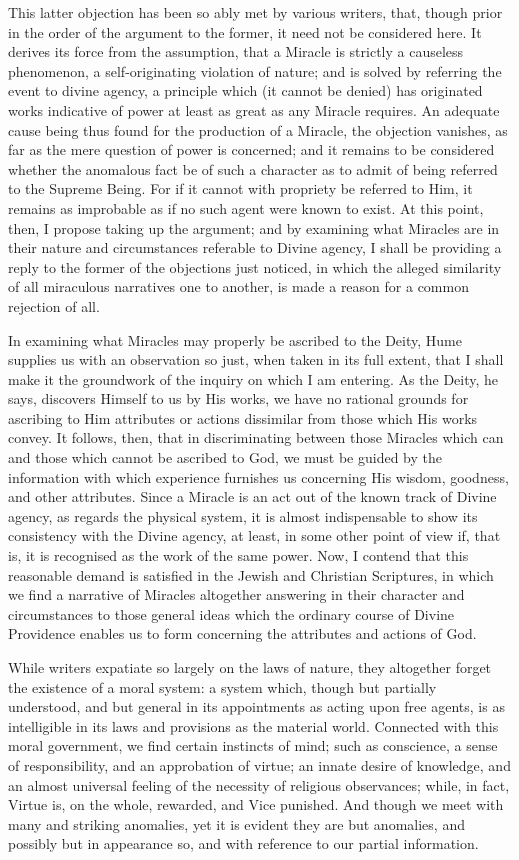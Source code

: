 This latter objection has been so ably met by
various writers, that, though prior in the order of the argument to
the former, it need not be considered here. It derives its force from
the assumption, that a Miracle is strictly a causeless phenomenon, a
self-originating violation of nature; and is solved by referring the
event to divine agency, a principle which (it cannot be denied) has
originated works indicative of power at least as great as any Miracle
requires. An adequate cause being thus found for the production of a
Miracle, the objection vanishes, as far as the mere question of power
is concerned; and it remains to be considered whether the anomalous
fact be of such a character as to admit of being referred to the
Supreme Being. For if it cannot with propriety be referred to Him, it
remains as improbable as if no such agent were known to exist. At this
point, then, I propose taking up the argument; and by examining what
Miracles are in their nature and circumstances referable to Divine
agency, I shall be providing a reply to the former of the objections
just noticed, in which the alleged similarity of all miraculous
narratives one to another, is made a reason for a common rejection of
all.

In examining what Miracles may properly be
ascribed to the Deity, Hume supplies us with an observation so just, when taken in its full extent, that I shall make it the
groundwork of the inquiry on which I am entering. As the Deity, he
says, discovers Himself to us by His works, we have no rational
grounds for ascribing to Him attributes or actions dissimilar from
those which His works convey. It follows, then, that in discriminating
between those Miracles which can and those which cannot be ascribed to
God, we must be guided by the information with which experience
furnishes us concerning His wisdom, goodness, and other attributes.
Since a Miracle is an act out of the known track of Divine agency, as
regards the physical system, it is almost indispensable to show its
consistency with the Divine agency, at least, in some other point of
view if, that is, it is recognised as the work of the same power. Now,
I contend that this reasonable demand is satisfied in the Jewish and
Christian Scriptures, in which we find a narrative of Miracles
altogether answering in their character and circumstances to those
general ideas which the ordinary course of Divine Providence enables
us to form concerning the attributes and actions of God.

While writers expatiate so largely on the laws of
nature, they altogether forget the existence of a moral system: a
system which, though but partially understood, and but general in its
appointments as acting upon free agents, is as intelligible in its
laws and provisions as the material world. Connected with this moral government, we find certain instincts of mind; such as
conscience, a sense of responsibility, and an approbation of virtue;
an innate desire of knowledge, and an almost universal feeling of the
necessity of religious observances; while, in fact, Virtue is, on the
whole, rewarded, and Vice punished. And though we meet with many and
striking anomalies, yet it is evident they are but anomalies, and
possibly but in appearance so, and with reference to our partial
information.

